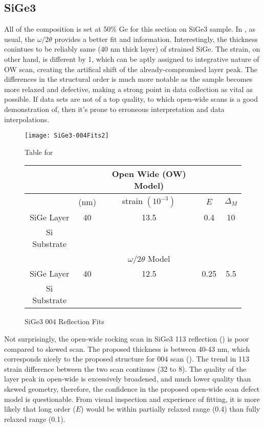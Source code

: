 \subsection{SiGe3}

All of the composition is set at 50\% Ge for this section on SiGe3 sample.  In , as usual, the $\omega/2\theta$ provides a better fit and information.  Interestingly, the thickness conintues to be reliably same (40 nm thick layer) of strained SiGe.  The strain, on other hand, is different by 1, which can be aptly assigned to integrative nature of OW scan, creating the artifical shift of the already-compromised layer peak.  The differences in the structural order is much more notable as the sample becomes more relaxed and defective, making a strong point in data collection as vital as possible.  If data sets are not of a top quality, to which open-wide scans is a good demonstration of, then it's prone to erroneous interpretation and data interpolations.

\begin{figure}[hc]%
\caption{SiGe3 004 Reflection Fits}
\label{SiGe3-004}
\begin{minipage}{0.85\linewidth}
\texttt{[image: SiGe3-004Fits2]}
\end{minipage}
\begin{minipage}{\linewidth}
\centering
\vspace{10pt}
Table for \\
\vspace{5pt}
\begin{tabular}{c|cccc}
			& 	&Open Wide (OW) Model)	 \\
\hline
			&	(nm)	&	strain	 $(10^{-3})$&	$E$ &  $\Delta_M$\\
\hline
SiGe Layer		&  	40	&      13.5	 &0.4 & 10 	\\
Si Substrate		&	\textemdash & \textemdash&\textemdash\ &\textemdash	\\
\hline
			& &$\omega/2\theta$ Model \\
\hline
SiGe Layer		&	40	& 12.5	&0.25	&5.5 	\\
Si Substrate		&	\textemdash & \textemdash&\textemdash\ &\textemdash
\end{tabular}
\end{minipage}
\end{figure}

Not surprisingly, the open-wide rocking scan in SiGe3 113 reflection () is poor compared to skewed scan.  The proposed thickness is between 40-43 nm, which corresponds nicely to the proposed structure for 004 scan ().  The trend in 113 strain difference between the two scan continues (32 to 8).  The quality of the layer peak in open-wide is excessively broadened, and much lower quality than skewed geometry, therefore, the confidence in the proposed open-wide scan defect model is questionable.  From visual inspection and experience of fitting, it is more likely that long order ($E$) would be within partially relaxed range (0.4) than fully relaxed range (0.1).

